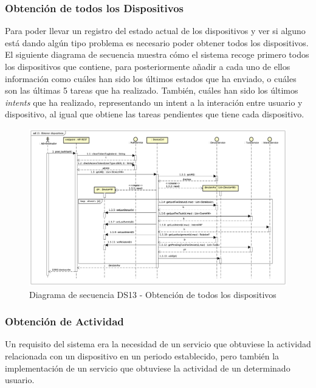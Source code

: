 \newpage
\subsubsection{Obtención de todos los Dispositivos}

Para poder llevar un registro del estado actual de los dispositivos y ver si alguno está dando algún tipo problema es necesario poder obtener todos los dispositivos.
El siguiente diagrama de secuencia muestra cómo el sistema recoge primero todos los dispositivos que contiene, para posteriormente añadir a cada uno de ellos información como cuáles han sido los últimos estados que ha enviado, o cuáles son las últimas 5 tareas que ha realizado. También, cuáles han sido los últimos \textit{intents} que ha realizado, representando un intent a la interación entre usuario y dispositivo, al igual que obtiene las tareas pendientes que tiene cada dispositivo.

\begin{figure}[H]
    \centering
    \includegraphics[width=14cm]{./img/sequence/diagram/ObtenerDispositivos.png}
    \caption{Diagrama de secuencia DS13 - Obtención de todos los dispositivos}
    \label{fig:seq.GetDevices}
\end{figure}

\newpage
\subsubsection{Obtención de Actividad}

Un requisito del sistema era la necesidad de un servicio que obtuviese la actividad relacionada con un dispositivo en un periodo establecido, pero también la implementación de un servicio que obtuviese la actividad de un determinado usuario.

